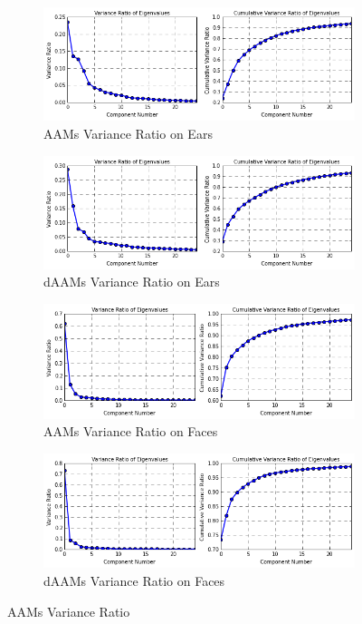 \begin{figure}[h!]
    \centering
    \begin{subfigure}[b]{0.5\textwidth}
            \includegraphics[width=\textwidth]{supports/Model_Analysis/ear_aam_eigen_shape}
        \caption{AAMs Variance Ratio on Ears}
    \end{subfigure}
    \begin{subfigure}[b]{0.5\textwidth}
            \includegraphics[width=\textwidth]{supports/Model_Analysis/ear_of_eigen_shape}
        \caption{dAAMs Variance Ratio on Ears}
    \end{subfigure}
    \begin{subfigure}[b]{0.5\textwidth}
            \includegraphics[width=\textwidth]{supports/Model_Analysis/face_aam_eigen_shape}
        \caption{AAMs Variance Ratio on Faces}
    \end{subfigure}
    \begin{subfigure}[b]{0.5\textwidth}
            \includegraphics[width=\textwidth]{supports/Model_Analysis/face_of_eigen_shape}
        \caption{dAAMs Variance Ratio on Faces}
    \end{subfigure}
    \caption{AAMs Variance Ratio}
    \label{fig:compact}
\end{figure}

